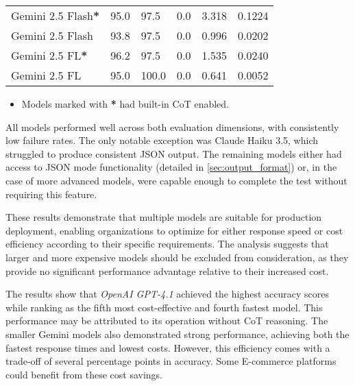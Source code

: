 \begin{table}[H]
\begin{tabularx}{\textwidth}{Xp{2.5cm}p{2.2cm}p{1.5cm}p{1.8cm}p{2cm}}
        \rowcolor[gray]{0.9}
        Gemini 2.5 Flash\textbf{*}  & 95.0                                  & 97.5                                  & 0.0                        & 3.318                         & 0.1224                           \\
        Gemini 2.5 Flash            & 93.8                                  & 97.5                                  & 0.0                        & 0.996                         & 0.0202                           \\
        \rowcolor[gray]{0.9}
        Gemini 2.5 FL\textbf{*}     & 96.2                                  & 97.5                                  & 0.0                        & 1.535                         & 0.0240                           \\
        Gemini 2.5 FL               & 95.0                                  & 100.0                                 & 0.0                        & 0.641                         & 0.0052                           \\
        \bottomrule
    \end{tabularx}

    \begin{itemize}
        \footnotesize
        \item Models marked with \textbf{*} had built-in CoT enabled.
    \end{itemize}
\end{table}

All models performed well across both evaluation dimensions, with consistently low failure rates.
The only notable exception was Claude Haiku 3.5, which struggled to produce consistent JSON output.
The remaining models either had access to JSON mode functionality (detailed in \cref{sec:output_format}) or, in the case of more advanced models, were capable enough to complete the test without requiring this feature.

These results demonstrate that multiple models are suitable for production deployment, enabling organizations to optimize for either response speed or cost efficiency according to their specific requirements.
The analysis suggests that larger and more expensive models should be excluded from consideration, as they provide no significant performance advantage relative to their increased cost.

The results show that \textit{OpenAI GPT-4.1} achieved the highest accuracy scores while ranking as the fifth most cost-effective and fourth fastest model.
This performance may be attributed to its operation without CoT reasoning.
The smaller Gemini models also demonstrated strong performance, achieving both the fastest response times and lowest costs. However, this efficiency comes with a trade-off of several percentage points in accuracy.
Some E-commerce platforms could benefit from these cost savings.

